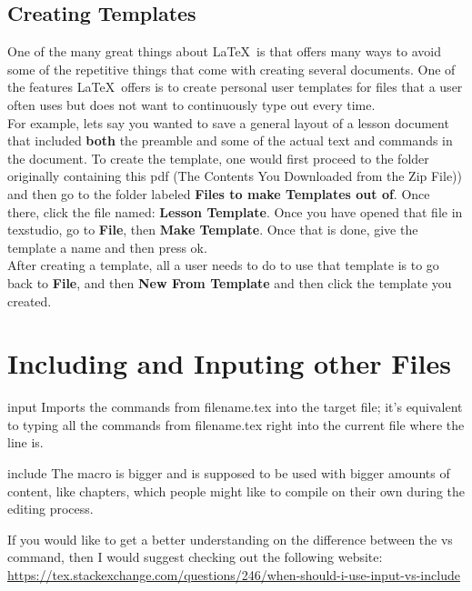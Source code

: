 	\subsection{Creating Templates}
		One of the many great things about \LaTeX\ is that offers many ways to avoid some of the repetitive things that come with creating several documents. One of the features \LaTeX\ offers is to create personal user templates for files that a user often uses but does not want to continuously type out every time.\\
		For example, lets say you wanted to save a general layout of a lesson document that included \textbf{both} the preamble and some of the actual text and commands in the document. 
		To create the template, one would first proceed to the folder originally containing this pdf (The Contents You Downloaded from the Zip File)) and then go to the folder labeled \textbf{Files to make Templates out of}. Once there, click the file named: \textbf{Lesson Template}. Once you have opened that file in texstudio, go to \textbf{File}, then \textbf{Make Template}. Once that is done, give the template a name and then press ok.\\
		After creating a template, all a user needs to do to use that template is to go back to \textbf{File}, and then \textbf{New From Template} and then click the template you created.
	\vspace{-1.5mm}
\newpage
\section{Including and Inputing other Files}
\vspace{10.5cm}
	\begin{docCommand}{input}{}
		Imports the commands from filename.tex into the target file; it's equivalent to typing all the commands from filename.tex right into the current file where the  line is. 
	\end{docCommand}
	\begin{docCommand}{include}{}
		The  macro is bigger and is supposed to be used with bigger amounts of content, like chapters, which people might like to compile on their own during the editing process.
	\end{docCommand}
If you would like to get a better understanding on the difference between the  vs  command, then I would suggest checking out the following website:\\ 
\url{https://tex.stackexchange.com/questions/246/when-should-i-use-input-vs-include}\\
\newpage
